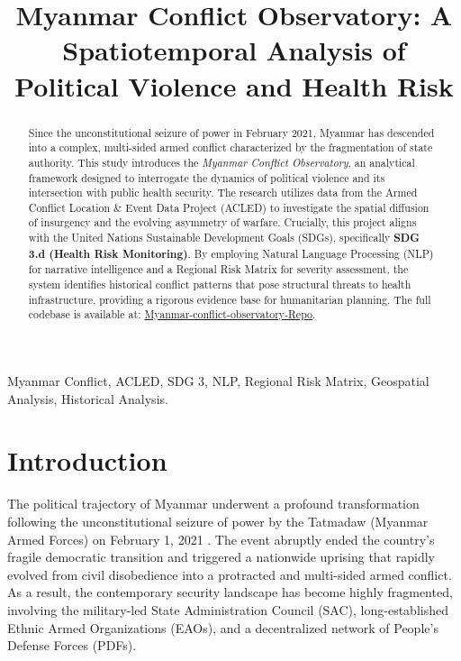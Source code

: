 \documentclass[conference]{IEEEtran}
\title{Myanmar Conflict Observatory: A Spatiotemporal Analysis of Political Violence and Health Risk}
\author{
    \IEEEauthorblockN{Tain Yan Tun}%
    \IEEEauthorblockA{\textit{Faculty of Information Technology} \\ 
    \textit{Big Data Research}\\
    Saraburi, Thailand}%
}
\begin{document}
\maketitle

\begin{abstract}
Since the unconstitutional seizure of power in February 2021, Myanmar has descended into a complex, multi-sided armed conflict characterized by the fragmentation of state authority. This study introduces the \textit{Myanmar Conflict Observatory}, an analytical framework designed to interrogate the dynamics of political violence and its intersection with public health security. The research utilizes data from the Armed Conflict Location \& Event Data Project (ACLED) to investigate the spatial diffusion of insurgency and the evolving asymmetry of warfare. Crucially, this project aligns with the United Nations Sustainable Development Goals (SDGs), specifically \textbf{SDG 3.d (Health Risk Monitoring)}. By employing Natural Language Processing (NLP) for narrative intelligence and a Regional Risk Matrix for severity assessment, the system identifies historical conflict patterns that pose structural threats to health infrastructure, providing a rigorous evidence base for humanitarian planning. The full codebase is available at: \href{https://github.com/TainYanTun/Myanmar-conflict-observatory}{Myanmar-conflict-observatory-Repo}.
\end{abstract}

\begin{IEEEkeywords}
Myanmar Conflict, ACLED, SDG 3, NLP, Regional Risk Matrix, Geospatial Analysis, Historical Analysis.
\end{IEEEkeywords}

\section{Introduction}

The political trajectory of Myanmar underwent a profound transformation following the unconstitutional seizure of power by the Tatmadaw (Myanmar Armed Forces) on February 1, 2021 \cite{bertolt2022myanmar}. The event abruptly ended the country’s fragile democratic transition and triggered a nationwide uprising that rapidly evolved from civil disobedience into a protracted and multi-sided armed conflict.  As a result, the contemporary security landscape has become highly fragmented, involving the military-led State Administration Council (SAC), long-established Ethnic Armed Organizations (EAOs), and a decentralized network of People’s Defense Forces (PDFs).
\end{document}
